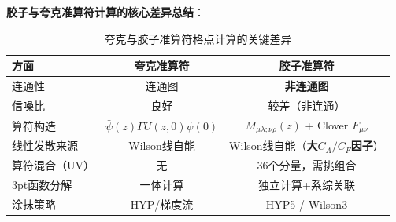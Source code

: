 \documentclass[12pt,a4paper]{ctexart}
\theoremstyle{definition}
\begin{document}
\textbf{胶子与夸克准算符计算的核心差异总结}：
\begin{table}[H]
\centering
\caption{夸克与胶子准算符格点计算的关键差异}
\label{tab:quark_vs_gluon_compute}
\begin{tabular}{lcc}
\toprule
方面 & 夸克准算符 & 胶子准算符 \\
\midrule
连通性 & 连通图 & \textbf{非连通图} \\
信噪比 & 良好 & 较差（非连通） \\
算符构造 & $\bar{\psi}(z)\Gamma U(z,0)\psi(0)$ & $M_{\mu\lambda;\nu\rho}(z)$ + Clover $F_{\mu\nu}$ \\
线性发散来源 & Wilson线自能 & Wilson线自能（\textbf{大$C_A/C_F$因子}）\\
算符混合（UV） & 无 & 36个分量，需挑组合 \\
3pt函数分解 & 一体计算 & 独立计算+系综关联 \\
涂抹策略 & HYP/梯度流 & HYP5 / Wilson3 \\
\bottomrule
\end{tabular}
\end{table}
\end{document}

